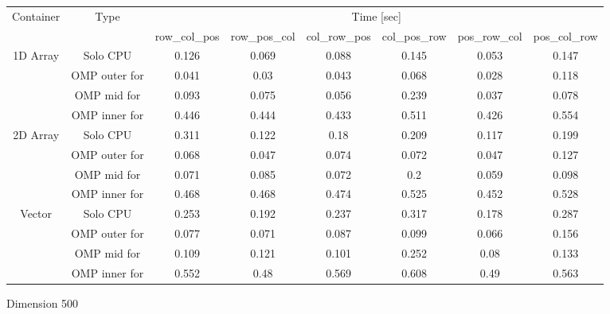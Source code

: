 \begin{tabular}{ |c|c|c|c|c|c|c|c|  }
\hline 
\multirow{2}{*}{Container}  & \multirow{2}{*}{Type} & \multicolumn{6}{c|}{ Time [sec] } \\  \cline{3-8}

                          & & row\_col\_pos & row\_pos\_col & col\_row\_pos & col\_pos\_row  & pos\_row\_col & pos\_col\_row \\
\hline 
\multirow{4}{*}{1D Array}   & Solo CPU      & 0.126 &0.069 &0.088 &0.145 &0.053 &0.147 \\
                            & OMP outer for & 0.041 &0.03 &0.043 &0.068 &0.028 &0.118 \\
                            & OMP mid for   & 0.093 &0.075 &0.056 &0.239 &0.037 &0.078 \\
                            & OMP inner for & 0.446 &0.444 &0.433 &0.511 &0.426 &0.554 \\

\hline 
\multirow{4}{*}{2D Array}  
                            & Solo CPU      & 0.311 &0.122 &0.18 &0.209 &0.117 &0.199 \\
                            & OMP outer for & 0.068 &0.047 &0.074 &0.072 &0.047 &0.127 \\
                            & OMP mid for   & 0.071 &0.085 &0.072 &0.2 &0.059 &0.098 \\
                            & OMP inner for & 0.468 &0.468 &0.474 &0.525 &0.452 &0.528 \\

\hline 
\multirow{4}{*}{Vector}     
                            & Solo CPU      & 0.253 &0.192 &0.237 &0.317 &0.178 &0.287 \\                           
                            & OMP outer for & 0.077 &0.071 &0.087 &0.099 &0.066 &0.156 \\
                            & OMP mid for   & 0.109 &0.121 &0.101 &0.252 &0.08 &0.133 \\
                            & OMP inner for & 0.552 &0.48 &0.569 &0.608 &0.49 &0.563 \\  
\hline
\end{tabular}
\caption{ Dimension 500}
\label{table2pc}
